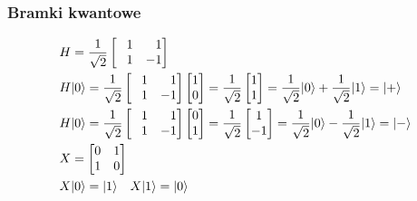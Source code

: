 \documentclass[10pt,t]{beamer}
\begin{document}
\begin{frame}
  \frametitle{Bramki kwantowe}


  \begin{align*}
    &H =
    \frac{ 1 }{ \sqrt{ 2 } }
    \begin{bmatrix}
      \hphantom{-} 1 & \hphantom{-} 1 \\
      \hphantom{-} 1 & -1
    \end{bmatrix} \\
    &H | 0 \rangle =
      \frac{ 1 }{ \sqrt{ 2 } }
    \begin{bmatrix}
      \hphantom{-} 1 & \hphantom{-} 1 \\
      \hphantom{-} 1 & -1
    \end{bmatrix}
                       \begin{bmatrix}
                         1 \\
                         0
                       \end{bmatrix}
    =
    \frac{ 1 }{ \sqrt{ 2 } }
    \begin{bmatrix}
      1 \\
      1
    \end{bmatrix}
    =
    \frac{ 1 }{ \sqrt{ 2 } } | 0 \rangle + \frac{ 1 }{ \sqrt{ 2 } } | 1 \rangle
    = | + \rangle \\
        &H | 0 \rangle
      =
      \frac{ 1 }{ \sqrt{ 2 } }
    \begin{bmatrix}
      \hphantom{-} 1 & \hphantom{-} 1 \\
      \hphantom{-} 1 & -1
    \end{bmatrix}
                       \begin{bmatrix}
                         0 \\
                         1
                       \end{bmatrix}
    =
    \frac{ 1 }{ \sqrt{ 2 } }
    \begin{bmatrix}
      1 \\
      -1
    \end{bmatrix}
    =
    \frac{ 1 }{ \sqrt{ 2 } } | 0 \rangle - \frac{ 1 }{ \sqrt{ 2 } } | 1 \rangle
    = | - \rangle \\
    &X
      =
      \begin{bmatrix}
        0 & 1 \\
        1 & 0
      \end{bmatrix} \\
    &X | 0 \rangle = | 1 \rangle \quad X | 1 \rangle = | 0 \rangle
  \end{align*}


\end{frame}
\end{document}

